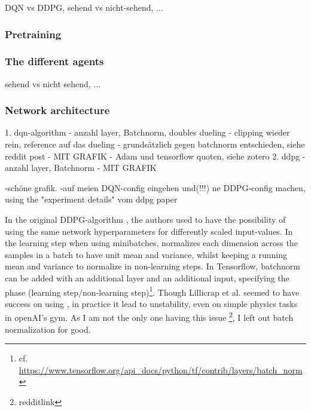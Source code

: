 DQN vs DDPG, sehend vs nicht-sehend, ...

\subsubsection{Pretraining}

\subsubsection{The different agents}

sehend vs nicht sehend, ...

\subsubsection{Network architecture}

1. dqn-algorithm
- anzahl layer, Batchnorm, doubles dueling
- clipping wieder rein, reference auf das dueling
- grundsätzlich gegen batchnorm entschieden, siehe reddit post
- MIT GRAFIK
- Adam und tensorflow quoten, siehe zotero
2. ddpg
- anzahl layer, Batchnorm
- MIT GRAFIK

-schöne grafik.
-auf meien DQN-config eingehen und(!!!) ne DDPG-config machen, using the "experiment details" vom ddpg paper  


In the original DDPG-algorithm \cite{lillicrap_continuous_2015}, the authors used  \cite{ioffe_batch_2015} to have the possibility of using the same network hyperparameters for differently scaled input-values. In the learning step when using minibatches, \batchnorm normalizes each dimension across the samples in a batch to have unit mean and variance, whilst keeping a running mean and variance to normalize in non-learning steps. In Tensorflow, batchnorm can be added with an additional layer and an additional input, specifying the phase (learning step/non-learning step)\footnote{cf. \url{https://www.tensorflow.org/api\_docs/python/tf/contrib/layers/batch_norm}}. Though Lillicrap et al. seemed to have success on using \batchnorm, in practice it lead to unstability, even on simple physics tasks in openAI's gym. As I am not the only one having this issue \footnote{redditlink}, I left out batch normalization for good.

